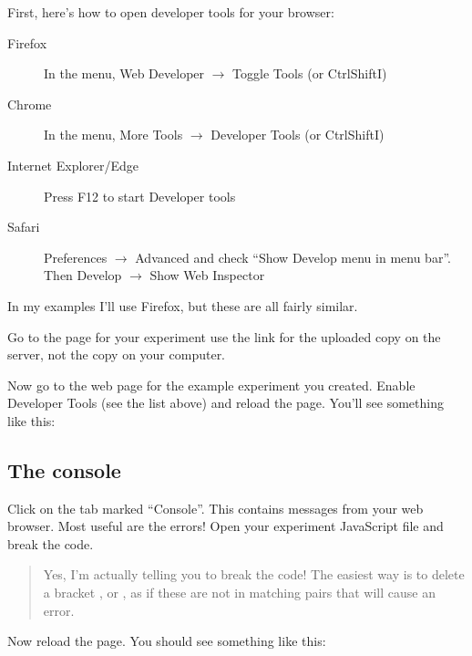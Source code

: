 \documentclass[letterpaper,10pt,english]{sphinxmanual}
\begin{document}
First, here’s how to open developer tools for your browser:
\begin{description}
\item[{Firefox}] \leavevmode
In the menu, Web Developer \(\rightarrow\) Toggle Tools (or Ctrl\sphinxhyphen{}Shift\sphinxhyphen{}I)

\item[{Chrome}] \leavevmode
In the menu, More Tools \(\rightarrow\) Developer Tools (or Ctrl\sphinxhyphen{}Shift\sphinxhyphen{}I)

\item[{Internet Explorer/Edge}] \leavevmode
Press F12 to start Developer tools

\item[{Safari}] \leavevmode
Preferences \(\rightarrow\) Advanced and check “Show Develop menu in menu bar”.
Then Develop \(\rightarrow\) Show Web Inspector

\end{description}

In my examples I’ll use Firefox, but these are all fairly similar.

Go to the page for your experiment \textendash{} use the link for the
uploaded copy on the server, not the copy on your computer.

Now go to the web page for the example experiment
you created. Enable Developer Tools (see the list above) and
reload the page. You’ll see something like this:

\noindent{}


\subsection{The console}
\label{\detokenize{jspsych_au:the-console}}
Click on the tab marked “Console”. This contains messages from your web browser.
Most useful are the errors! Open your experiment JavaScript file and break the code.
\begin{quote}

Yes, I’m actually telling you to break the code! The easiest way is to delete
a bracket \textendash{} \sphinxcode{\sphinxupquote{(}}, \sphinxcode{\sphinxupquote{{[}}} or \sphinxcode{\sphinxupquote{\{}}, as if these are not in matching pairs that will cause an
error.
\end{quote}

Now reload the page. You should see something like this:

\noindent{}
\end{document}
